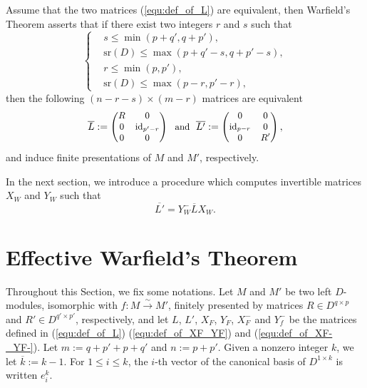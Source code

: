 \documentclass{ifacconf}
\newcommand\id[1]{\text{id}_{#1}}
\newcommand\sr{\text{sr}(D)}
\begin{document}
Assume that the two matrices (\ref{equ:def_of_L}) are equivalent, then
Warfield's Theorem asserts that if there exist two integers $r$ and $s$
such that
\medskip
\begin{equation}\label{equ:s_r}
  \left\{
  \begin{split}
    & s\leq\min(p+q',q+p'),\\
    & \sr\leq\max(p+q'-s,q+p'-s),\\
    &r\leq\min(p,p'), \\
    & \sr\leq\max(p-r, p'-r),
  \end{split}
  \right.
\end{equation}
\medskip
then the following $(n-r-s)\times (m-r)$ matrices are equivalent
\medskip
\begin{equation}\label{equ:def_of_L_bar}
  \begin{small}
    \overline{L}:=\begin{pmatrix}
    R & 0 \\
    0 & \id{p'-r} \\
    0 & 0
    \end{pmatrix}\ \ \text{and}\ \
    \overline{L'}:=\begin{pmatrix}
    0 & 0 \\
    \id{p-r} & 0 \\
    0 & R'
    \end{pmatrix},
  \end{small}
\end{equation}
\medskip
and induce finite presentations of $M$ and $M'$, respectively.

In the next section, we introduce a procedure which computes invertible
matrices $X_W$ and $Y_W$ such that
\medskip
\[\overline{L'}=Y_W^-\overline{L}X_W.\]

\section{Effective Warfield's Theorem}

Throughout this Section, we fix some notations. Let $M$ and $M'$ be two
left $D$-modules, isomorphic with $f:M\overset{\sim}{\to}M'$, finitely
presented by matrices $R\in D^{q\times p}$ and $R'\in D^{q'\times p'}$,
respectively, and let $L$, $L'$, $X_F$, $Y_F$, $X_F^-$ and $Y_f^-$ be the
matrices defined in (\ref{equ:def_of_L}) (\ref{equ:def_of_XF_YF}) and
(\ref{equ:def_of_XF-_YF-}). Let $m:=q+p'+p+q'$ and $n:=p+p'$. Given a
nonzero integer $k$, we let $\overline{k}:=k-1$. For $1\leq i\leq k$, the
$i$-th vector of the canonical basis of $D^{1\times k}$ is written $e_i^k$. 
\end{document}

